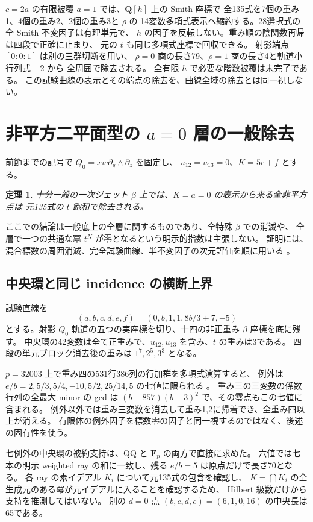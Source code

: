\documentclass[11pt,a4paper]{ltjsarticle}
\newcommand{\QQ}{\mathbf Q}
\newtheorem{theorem}{定理}[section]
\theoremstyle{remark}
\begin{document}
$c=2a$ の有限被覆 $a=1$ では、$\QQ[h]$ 上の Smith 座標で
全135式を7個の重み1、4個の重み2、2個の重み3と $\rho$ の
14変数多項式表示へ縮約する。28選択式の全 Smith 不変因子は有理単元で、
$h$ の因子を反転しない。重み順の陰関数再帰は四段で正確に止まり、
元の $t$ も同じ多項式座標で回収できる\cite{sigma-pencil-v60}。
射影端点 $[0:0:1]$ は別の三群切断を用い、
$\rho=0$ 商の長さ79、$\rho=1$ 商の長さ4と軌道小行列式 $-2$ から
全周囲で除去される\cite{sigma-infinity-v60}。
全有限 $h$ で必要な階数被覆は未完了である。
この試験曲線の表示とその端点の除去を、曲線全域の除去とは同一視しない。

\section{非平方二平面型の $a=0$ 層の一般除去}
\label{sec:a-zero-removal}
前節までの記号で $Q_0=xw\partial_y\wedge\partial_z$ を固定し、
$u_{12}=u_{13}=0$、$K=5c+f$ とする。
\begin{theorem}\label{thm:a-zero-removal}
十分一般の一次ジェット $\beta$ 上では、$K=a=0$ の表示から来る全非平方点は
元135式の $t$ 飽和で除去される。
\end{theorem}
ここでの結論は一般底上の全層に関するものであり、全特殊 $\beta$ での消滅や、
全層で一つの共通な冪 $t^N$ が零となるという明示的指数は主張しない。
証明には、混合標数の周囲消滅、完全試験曲線、半不変因子の次元評価を順に用いる
\cite{a-zero-lift-v61,a-zero-review-v61}。

\subsection{中央環と同じ incidence の横断上界}
試験直線を
\[
 (a,b,c,d,e,f)=(0,b,1,1,8b/3+7,-5)
\]
とする。射影 $Q_0$ 軌道の五つの実座標を切り、十四の非正重み $\beta$ 座標を底に残す。
中央環の42変数は全て正重みで、$u_{12},u_{13}$ を含み、$t$ の重みは3である。
四段の単元ブロック消去後の重みは $1^7,2^5,3^3$ となる。

$p=32003$ 上で重み四の531行386列の行加群を多項式演算すると、
例外は $e/b=2,5/3,5/4,-10,5/2,25/14,5$ の七値に限られる
\cite{a-zero-central-v61}。
重み三の三変数の係数行列の全最大 minor の gcd は
$(b-857)(b-3)^2$ で、その零点もこの七値に含まれる。
例外以外では重み三変数を消去して重み1,2に帰着でき、全重み四以上が消える。
有限体の例外因子を標数零の因子と同一視するのではなく、後述の固有性を使う。

七例外の中央環の被約支持は、QQ と $\mathbf F_p$ の両方で直接に求めた。
六値では七本の明示 weighted ray の和に一致し、残る $e/b=5$ は原点だけで長さ70となる。
各 ray の素イデアル $K_i$ について元135式の包含を確認し、
$K=\bigcap K_i$ の全生成元のある冪が元イデアルに入ることを確認するため、
Hilbert 級数だけから支持を推測してはいない。
別の $d=0$ 点 $(b,c,d,e)=(6,1,0,16)$ の中央長は65である。
\end{document}
